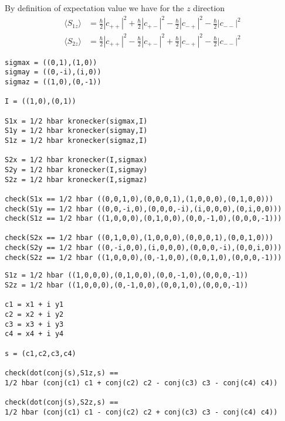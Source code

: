 By definition of expectation value we have for the $z$ direction
\begin{align*}
\langle S_{1z}\rangle
&=\tfrac{\hbar}{2}|c_{++}|^2+\tfrac{\hbar}{2}|c_{+-}|^2
-\tfrac{\hbar}{2}|c_{-+}|^2-\tfrac{\hbar}{2}|c_{--}|^2
\\
\langle S_{2z}\rangle
&=\tfrac{\hbar}{2}|c_{++}|^2-\tfrac{\hbar}{2}|c_{+-}|^2
+\tfrac{\hbar}{2}|c_{-+}|^2-\tfrac{\hbar}{2}|c_{--}|^2
\end{align*}

\newpage
{}

{\footnotesize\begin{verbatim}
sigmax = ((0,1),(1,0))
sigmay = ((0,-i),(i,0))
sigmaz = ((1,0),(0,-1))

I = ((1,0),(0,1))

S1x = 1/2 hbar kronecker(sigmax,I)
S1y = 1/2 hbar kronecker(sigmay,I)
S1z = 1/2 hbar kronecker(sigmaz,I)

S2x = 1/2 hbar kronecker(I,sigmax)
S2y = 1/2 hbar kronecker(I,sigmay)
S2z = 1/2 hbar kronecker(I,sigmaz)

check(S1x == 1/2 hbar ((0,0,1,0),(0,0,0,1),(1,0,0,0),(0,1,0,0)))
check(S1y == 1/2 hbar ((0,0,-i,0),(0,0,0,-i),(i,0,0,0),(0,i,0,0)))
check(S1z == 1/2 hbar ((1,0,0,0),(0,1,0,0),(0,0,-1,0),(0,0,0,-1)))

check(S2x == 1/2 hbar ((0,1,0,0),(1,0,0,0),(0,0,0,1),(0,0,1,0)))
check(S2y == 1/2 hbar ((0,-i,0,0),(i,0,0,0),(0,0,0,-i),(0,0,i,0)))
check(S2z == 1/2 hbar ((1,0,0,0),(0,-1,0,0),(0,0,1,0),(0,0,0,-1)))
\end{verbatim}}

\newpage
{}

{\footnotesize\begin{verbatim}
S1z = 1/2 hbar ((1,0,0,0),(0,1,0,0),(0,0,-1,0),(0,0,0,-1))
S2z = 1/2 hbar ((1,0,0,0),(0,-1,0,0),(0,0,1,0),(0,0,0,-1))

c1 = x1 + i y1
c2 = x2 + i y2
c3 = x3 + i y3
c4 = x4 + i y4

s = (c1,c2,c3,c4)

check(dot(conj(s),S1z,s) ==
1/2 hbar (conj(c1) c1 + conj(c2) c2 - conj(c3) c3 - conj(c4) c4))

check(dot(conj(s),S2z,s) ==
1/2 hbar (conj(c1) c1 - conj(c2) c2 + conj(c3) c3 - conj(c4) c4))
\end{verbatim}}


